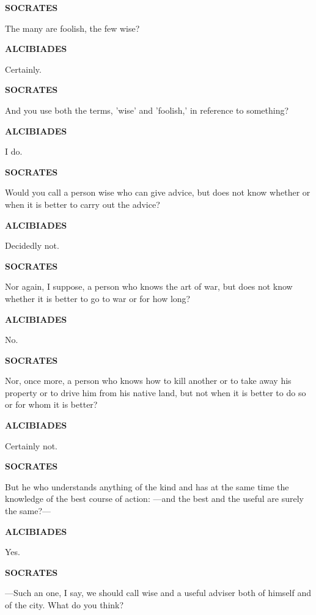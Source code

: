 \documentclass[11pt,letter]{article}
\begin{document}
\par \textbf{SOCRATES}
\par   The many are foolish, the few wise?

\par \textbf{ALCIBIADES}
\par   Certainly.

\par \textbf{SOCRATES}
\par   And you use both the terms, 'wise' and 'foolish,' in reference to something?

\par \textbf{ALCIBIADES}
\par   I do.

\par \textbf{SOCRATES}
\par   Would you call a person wise who can give advice, but does not know whether or when it is better to carry out the advice?

\par \textbf{ALCIBIADES}
\par   Decidedly not.

\par \textbf{SOCRATES}
\par   Nor again, I suppose, a person who knows the art of war, but does not know whether it is better to go to war or for how long?

\par \textbf{ALCIBIADES}
\par   No.

\par \textbf{SOCRATES}
\par   Nor, once more, a person who knows how to kill another or to take away his property or to drive him from his native land, but not when it is better to do so or for whom it is better?

\par \textbf{ALCIBIADES}
\par   Certainly not.

\par \textbf{SOCRATES}
\par   But he who understands anything of the kind and has at the same time the knowledge of the best course of action: —and the best and the useful are surely the same?—

\par \textbf{ALCIBIADES}
\par   Yes.

\par \textbf{SOCRATES}
\par  —Such an one, I say, we should call wise and a useful adviser both of himself and of the city. What do you think?
\end{document}
